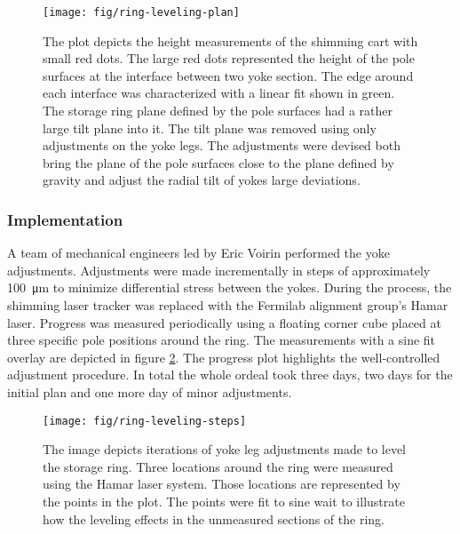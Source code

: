 \begin{figure}
\centering
\texttt{[image: fig/ring-leveling-plan]}
\caption{
    The plot depicts the height measurements of the shimming cart with small red dots.  The large red dots represented the height of the pole surfaces at the interface between two yoke section.  The edge around each interface was characterized with a linear fit shown in green.  The storage ring plane defined by the pole surfaces had a rather large tilt plane into it.  The tilt plane was removed using only adjustments on the yoke legs.  The adjustments were devised both bring the plane of the pole surfaces close to the plane defined by gravity and adjust the radial tilt of yokes large deviations. 
    \label{fig:ring-leveling-plan}
}
\end{figure}

\subsubsection{Implementation}
A team of mechanical engineers led by Eric Voirin performed the yoke adjustments.  Adjustments were made incrementally in steps of approximately \SI{100}{\micro\meter} to minimize differential stress between the yokes.  During the process, the shimming laser tracker was replaced with the Fermilab alignment group's Hamar laser.  Progress was measured periodically using a floating corner cube placed at three specific pole positions around the ring.  The measurements with a sine fit overlay are depicted in figure \ref{fig:ring-leveling-steps}.  The progress plot highlights the well-controlled adjustment procedure.  In total the whole ordeal took three days, two days for the initial plan and one more day of minor adjustments.

\begin{figure}
\centering
\texttt{[image: fig/ring-leveling-steps]}
\caption{
    The image depicts iterations of yoke leg adjustments made to level the storage ring.  Three locations around the ring were measured using the Hamar laser system.  Those locations are represented by the points in the plot.  The points were fit to sine wait to illustrate how the leveling effects in the unmeasured sections of the ring. 
    \label{fig:ring-leveling-steps}
}
\end{figure}

